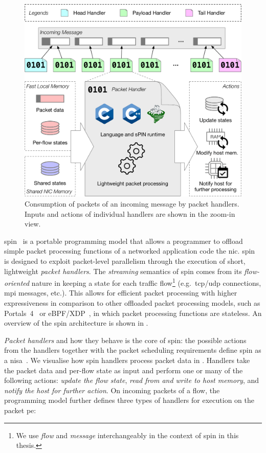 \begin{figure}[tp]
    \centering
    \includegraphics[width=.85\textwidth]{thesis/figures/spin-handlers.pdf}
    \caption{Consumption of packets of an incoming message by packet handlers.  Inputs and actions of individual handlers are shown in the zoom-in view.} \label{fig:spin-handlers}
\end{figure}

\ac{spin}~\cite{hoefler_spin_2017} is a portable programming model that allows a programmer to offload simple packet processing functions of a networked application code the \ac{nic}.  \ac{spin} is designed to exploit packet-level parallelism through the execution of short, lightweight \textit{packet handlers}.  The \emph{streaming} semantics of \ac{spin} comes from its \emph{flow-oriented} nature in keeping a state for each traffic flow\footnote{We use \emph{flow} and \emph{message} interchangeably in the context of \ac{spin} in this thesis.} (e.g.\ \acs{tcp}/\acs{udp} connections, \acs{mpi} messages, etc.).  This allows for efficient packet processing with higher expressiveness in comparison to other offloaded packet processing models, such as Portals~4~\cite{bosshart_p4_2014} or eBPF/XDP~\cite{vieira_fast_2021}, in which packet processing functions are stateless.  An overview of the \ac{spin} architecture is shown in .

\emph{Packet handlers} and how they behave is the core of \ac{spin}: the possible actions from the handlers together with the packet scheduling requirements define \ac{spin} as a \ac{nisa}~\cite{hoefler_spin_2017}.  We visualise how \ac{spin} handlers process packet data in .  Handlers take the packet data and per-flow state as input and perform one or many of the following actions: \emph{update the flow state}, \emph{read from and write to host memory}, and \emph{notify the host for further action}.  On incoming packets of a flow, the programming model further defines three types of handlers for execution on the packet \ac{pe}:

